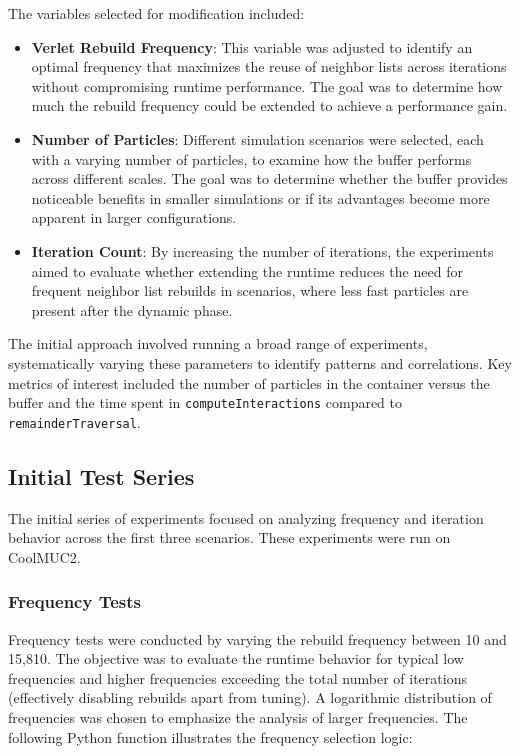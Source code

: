 The variables selected for modification included:
\begin{itemize}
    \item \textbf{Verlet Rebuild Frequency}: This variable was adjusted to identify an optimal frequency that maximizes the reuse of neighbor lists across iterations without compromising runtime performance. The goal was to determine how much the rebuild frequency could be extended to achieve a performance gain.
    \item \textbf{Number of Particles}: Different simulation scenarios were selected, each with a varying number of particles, to examine how the buffer performs across different scales. The goal was to determine whether the buffer provides noticeable benefits in smaller simulations or if its advantages become more apparent in larger configurations.

    \item \textbf{Iteration Count}: By increasing the number of iterations, the experiments aimed to evaluate whether extending the runtime reduces the need for frequent neighbor list rebuilds in scenarios, where less fast particles are present after the dynamic phase.
\end{itemize}

The initial approach involved running a broad range of experiments, systematically varying these parameters to identify patterns and correlations. Key metrics of interest included the number of particles in the container versus the buffer and the time spent in \texttt{computeInteractions} compared to \texttt{remainderTraversal}. 

\subsection{Initial Test Series}

The initial series of experiments focused on analyzing frequency and iteration behavior across the first three scenarios. These experiments were run on CoolMUC2.

\subsubsection{Frequency Tests}

Frequency tests were conducted by varying the rebuild frequency between 10 and 15,810. The objective was to evaluate the runtime behavior for typical low frequencies and higher frequencies exceeding the total number of iterations (effectively disabling rebuilds apart from tuning). A logarithmic distribution of frequencies was chosen to emphasize the analysis of larger frequencies. The following Python function illustrates the frequency selection logic:

